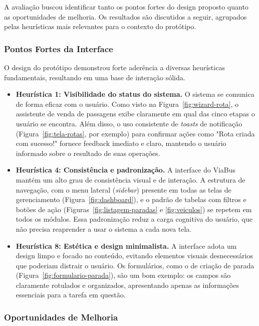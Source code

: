 A avaliação buscou identificar tanto os pontos fortes do design proposto quanto as oportunidades de melhoria. Os resultados são discutidos a seguir, agrupados pelas heurísticas mais relevantes para o contexto do protótipo.

\subsubsection{Pontos Fortes da Interface}

O design do protótipo demonstrou forte aderência a diversas heurísticas fundamentais, resultando em uma base de interação sólida.

\begin{itemize}
  \item \textbf{Heurística 1: Visibilidade do status do sistema.} O sistema se comunica de forma eficaz com o usuário. Como visto na Figura~\ref{fig:wizard-rota}, o assistente de venda de passagens exibe claramente em qual das cinco etapas o usuário se encontra. Além disso, o uso consistente de \textit{toasts} de notificação (Figura~\ref{fig:tela-rotas}, por exemplo) para confirmar ações como "Rota criada com sucesso!" fornece feedback imediato e claro, mantendo o usuário informado sobre o resultado de suas operações.

  \item \textbf{Heurística 4: Consistência e padronização.} A interface do ViaBus mantém um alto grau de consistência visual e de interação. A estrutura de navegação, com o menu lateral (\textit{sidebar}) presente em todas as telas de gerenciamento (Figura~\ref{fig:dashboard}), e o padrão de tabelas com filtros e botões de ação (Figuras~\ref{fig:listagem-paradas} e \ref{fig:veiculos}) se repetem em todos os módulos. Essa padronização reduz a carga cognitiva do usuário, que não precisa reaprender a usar o sistema a cada nova tela.

  \item \textbf{Heurística 8: Estética e design minimalista.} A interface adota um design limpo e focado no conteúdo, evitando elementos visuais desnecessários que poderiam distrair o usuário. Os formulários, como o de criação de parada (Figura~\ref{fig:formulario-parada}), são um bom exemplo: os campos são claramente rotulados e organizados, apresentando apenas as informações essenciais para a tarefa em questão.
\end{itemize}

\subsubsection{Oportunidades de Melhoria}

